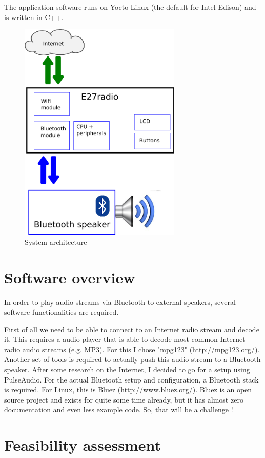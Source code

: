 \documentclass[12pt,a4paper]{scrreprt}
\begin{document}
The application software runs on Yocto Linux (the default for Intel Edison) and is written in C++.

\begin{figure}[h]
	\includegraphics[height=400px]{images/architecture}
	\caption{System architecture}
\end{figure}


\section{Software overview}
In order to play audio streams via Bluetooth to external speakers, several software functionalities are required.

First of all we need to be able to connect to an Internet radio stream and decode it. This requires a audio player that is able to decode  most common Internet radio audio streams (e.g. MP3). For this I chose "mpg123" (\url{http://mpg123.org/}). Another set of tools is required to actually push this audio stream to a Bluetooth speaker. 
After some research on the Internet, I decided to go for a setup using PulseAudio.
For the actual Bluetooth setup and configuration, a Bluetooth stack is required. For Linux, this is Bluez (\url{http://www.bluez.org/}). 
Bluez is an open source project and exists for quite some time already, but it has almost zero documentation and even less example code. So, that will be a challenge !

\section{Feasibility assessment}
\end{document}
